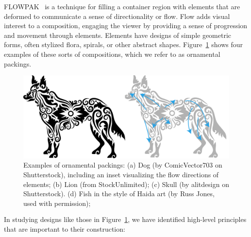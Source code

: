 \newtext
{
FLOWPAK~\cite{Saputra2017} is a technique for filling a container 
region with elements that are deformed 
to communicate a sense of directionality or flow.
Flow adds visual interest to a composition,
engaging the viewer by providing a sense of progression and
movement through elements.
Elements have designs of simple geometric forms, often stylized flora, spirals, or other abstract shapes. 
Figure~\ref{dog_flow} shows four examples of these sorts of compositions, which we refer to as ornamental packings.
}

\begin{figure}[t!] %
\centering
\includegraphics[width=1.0\textwidth]{figures/flowpak/dog_ornament_flow.pdf}
\caption[An example of flow visual style]{
  \label{dog_flow}  
\newtext
{
Examples of ornamental packings: 
(a) Dog (by ComicVector703 on Shutterstock), 
including an inset visualizing the flow directions of elements; 
(b) Lion (from StockUnlimited);  
(c) Skull (by alitdesign on Shutterstock).
(d) Fish in the style of Haida art (by Russ Jones, used with permission); 
}
}
\end{figure}


In studying designs like those in Figure~\ref{dog_flow}, we 
have identified high-level principles that are important
to their construction:

